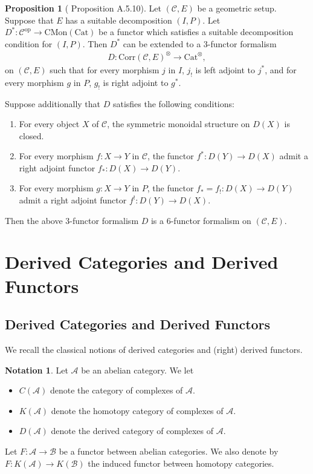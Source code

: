 \documentclass[a4paper,dvipdfmx,11pt,reqno]{amsart}
\DeclareMathOperator{\myop}{op}
\newcommand{\A}{\mathcal{A}}
\newcommand{\B}{\mathcal{B}}
\newcommand{\C}{\mathcal{C}}
\newcommand{\Cat}{\mathrm{Cat}}
\newcommand{\CMon}{\mathrm{CMon}}
\newcommand{\Corr}{\mathrm{Corr}}
\theoremstyle{definition}
\newtheorem{notation}[theorem]{Notation}
\newtheorem{proposition}[theorem]{Proposition}
\begin{document}
\begin{proposition}[\cite{Mann22} Proposition A.5.10] \label{Mann.prop.A.5.10}
  Let $(\C,E)$ be a geometric setup.
  Suppose that $E$ has a suitable decomposition $(I,P)$.
  Let $D^{*} : \C^{\myop} \to \CMon(\Cat)$ be a functor which satisfies a suitable decomposition condition for $(I,P)$.
  Then $D^{*}$ can be extended to a 3-functor formalism 
  \begin{align*}
    D : \Corr(\C,E)^{\otimes} \to \Cat^{\otimes},
  \end{align*}
  on $(\C,E)$ such that for every morphism $j$ in $I$, $j_{!}$ is left adjoint to $j^{*}$, and for every morphism $g$ in $P$, $g_{!}$ is right adjoint to $g^{*}$.

  Suppose additionally that $D$ satisfies the following conditions:
  \begin{enumerate}
    \item For every object $X$ of $\C$, the symmetric monoidal structure on $D(X)$ is closed.
    \item For every morphism $f : X \to Y$ in $\C$, the functor $f^{*} : D(Y) \to D(X)$ admit a right adjoint functor $f_{*} : D(X) \to D(Y)$.
    \item For every morphism $g : X \to Y$ in $P$, the functor $f_{*}=f_{!} : D(X) \to D(Y)$ admit a right adjoint functor $f^{!} : D(Y) \to D(X)$.
  \end{enumerate}
  Then the above 3-functor formalism $D$ is a 6-functor formalism on $(\C,E)$. 
\end{proposition}

\appendix 


\section{Derived Categories and Derived Functors} \label{sec.derived_categories}

\subsection{Derived Categories and Derived Functors}

We recall the classical notions of derived categories and (right) derived functors.

\begin{notation}
  Let $\A$ be an abelian category.
  We let
  \begin{itemize}
    \item $C(\A)$ denote the category of complexes of $\A$.
    \item $K(\A)$ denote the homotopy category of complexes of $\A$.
    \item $D(\A)$ denote the derived category of complexes of $\A$.
  \end{itemize}
  Let $F : \A \to \B$ be a functor between abelian categories.
  We also denote by $F : K(\A) \to K(\B)$ the induced functor between homotopy categories.
\end{notation}
\end{document}
